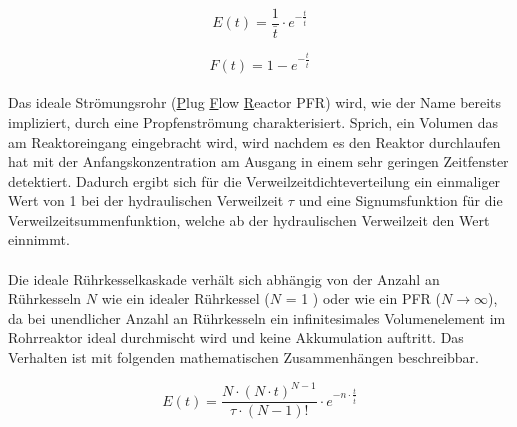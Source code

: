 \documentclass[12pt,liststotoc]{report}
\begin{document}
\begin{equation}
E(t) = \frac{1}{\bar{t}} \cdot e^{-\frac{t}{\bar{t}}}
\end{equation}

\begin{equation}
F(t) = 1 - e^{-\frac{t}{\bar{t}}}
\end{equation}
\noindent
\\
Das ideale Strömungsrohr (\underline{P}lug \underline{F}low \underline{R}eactor PFR) wird, wie der Name bereits impliziert, durch eine Propfenströmung charakterisiert. Sprich, ein Volumen das am Reaktoreingang eingebracht wird, wird nachdem es den Reaktor durchlaufen hat mit der Anfangskonzentration am Ausgang in einem sehr geringen Zeitfenster detektiert. Dadurch ergibt sich für die Verweilzeitdichteverteilung ein einmaliger Wert von 1 bei der hydraulischen Verweilzeit $\tau$ und eine Signumsfunktion für die Verweilzeitsummenfunktion, welche ab der hydraulischen Verweilzeit den Wert einnimmt. 
\\
\\
Die ideale Rührkesselkaskade verhält sich abhängig von der Anzahl an Rührkesseln $N$ wie ein idealer Rührkessel ($N$ = 1 ) oder wie ein PFR ($N \rightarrow \infty$), da bei unendlicher Anzahl an Rührkesseln ein infinitesimales Volumenelement im Rohrreaktor ideal durchmischt wird und keine Akkumulation auftritt. Das Verhalten ist mit folgenden mathematischen Zusammenhängen beschreibbar.

\begin{equation}
E(t) = \frac{N \cdot (N \cdot t)^{N-1}}{\tau \cdot (N-1)!} \cdot e^{-n \cdot \frac{t}{\bar{t}}}
\end{equation}
\end{document}
